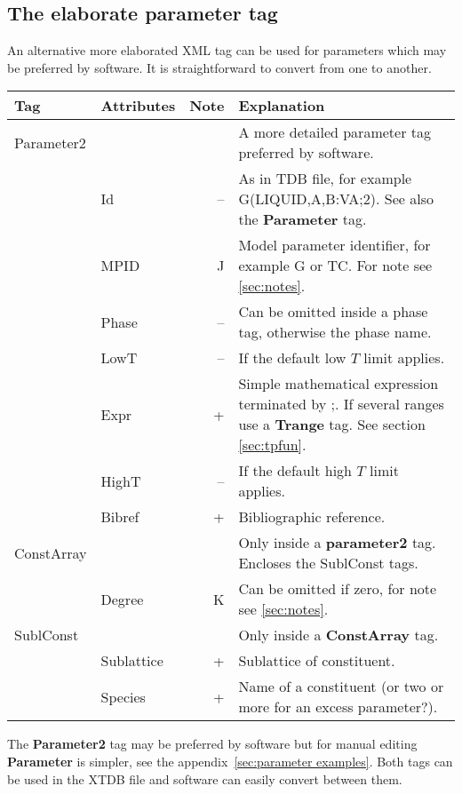 \documentclass{article}
\begin{document}
\subsection{The elaborate parameter tag}\label{sec:parameter2}

An alternative more elaborated XML tag can be used for parameters
which may be preferred by software.  It is straightforward to convert
from one to another.

\bigskip
\begin{tabular}{|p{} p{} r p{}|}\hline
  Tag & Attributes & Note & Explanation\\\hline

  Parameter2 & && A more detailed parameter tag preferred by software.\\
      & Id & -- & As in TDB file, for example G(LIQUID,A,B:VA;2).  See also the {\bf Parameter} tag. \\
      & MPID & J & Model parameter identifier, for example G or TC.  For note see \ref{sec:notes}.\\
      & Phase & -- & Can be omitted inside a phase tag, otherwise the phase name.\\
      & LowT & -- & If the default low $T$ limit applies.\\
      & Expr & + & Simple mathematical expression terminated by ;.  If several ranges use a {\bf Trange} tag.  See section \ref{sec:tpfun}.\\
      & HighT & -- & If the default high $T$ limit applies.\\
      & Bibref & + & Bibliographic reference.\\\hline

  ConstArray & && Only inside a {\bf parameter2} tag.  Encloses the
                   SublConst tags.\\
      & Degree & K & Can be omitted if zero, for note see \ref{sec:notes}.\\\hline
  
  SublConst & && Only inside a {\bf ConstArray} tag.\\
      & Sublattice & + &  Sublattice of constituent.\\
      & Species & + & Name of a constituent (or two or more 
                       for an excess parameter?).\\\hline
\end{tabular}

\bigskip
The {\bf Parameter2} tag may be preferred by software but for
manual editing {\bf Parameter} is simpler, see the
appendix~\ref{sec:parameter examples}.  Both tags can be used in
the XTDB file and software can easily convert between them.
\end{document}
